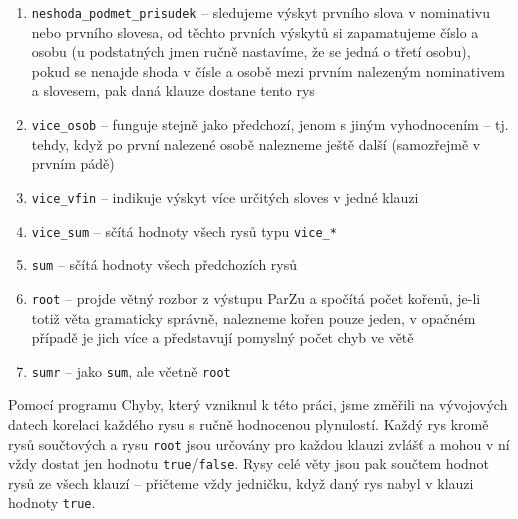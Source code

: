 \documentclass[12pt,a4paper]{report}
\begin{document}
\begin{enumerate}

\item{\texttt{neshoda\_podmet\_prisudek} -- sledujeme výskyt prvního slova v nominativu nebo prvního slovesa, od těchto prvních výskytů si zapamatujeme číslo a osobu (u podstatných jmen ručně nastavíme, že se jedná o třetí osobu), pokud se nenajde shoda v čísle a osobě mezi prvním nalezeným nominativem a slovesem, pak daná klauze dostane tento rys}
\item{\texttt{vice\_osob} -- funguje stejně jako předchozí, jenom s jiným vyhodnocením -- tj. tehdy, když po první nalezené osobě nalezneme ještě další (samozřejmě v prvním pádě)}
\item{\texttt{vice\_vfin} -- indikuje výskyt více určitých sloves v jedné klauzi}
\item{\texttt{vice\_sum} -- sčítá hodnoty všech rysů typu \texttt{vice\_*}}
\item{\texttt{sum} -- sčítá hodnoty všech předchozích rysů}
\item{\texttt{root} -- projde větný rozbor z výstupu ParZu a spočítá počet kořenů, je-li totiž věta gramaticky správně, nalezneme kořen pouze jeden, v opačném případě je jich více a představují pomyslný počet chyb ve větě}
\item{\texttt{sumr} -- jako \texttt{sum}, ale včetně \texttt{root}}
\end{enumerate}

Pomocí programu Chyby, který vzniknul k této práci, jsme změřili na vývojových datech korelaci každého rysu s ručně hodnocenou plynulostí. Každý rys kromě rysů součtových a rysu \texttt{root} jsou určovány pro každou klauzi zvlášť a mohou v ní vždy dostat jen hodnotu \texttt{true}/\texttt{false}. Rysy celé věty jsou pak součtem hodnot rysů ze všech klauzí -- přičteme vždy jedničku, když daný rys nabyl v klauzi hodnoty \texttt{true}.
\end{document}
